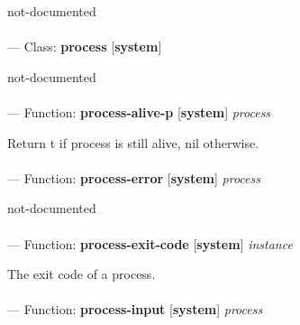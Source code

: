 \begin{adjustwidth}{5em}{5em}
not-documented
\end{adjustwidth}

\paragraph{}
\label{SYSTEM:PROCESS}
--- Class: \textbf{process} [\textbf{system}] \textit{}

\begin{adjustwidth}{5em}{5em}
not-documented
\end{adjustwidth}

\paragraph{}
\label{SYSTEM:PROCESS-ALIVE-P}
--- Function: \textbf{process-alive-p} [\textbf{system}] \textit{process}

\begin{adjustwidth}{5em}{5em}
Return t if process is still alive, nil otherwise.
\end{adjustwidth}

\paragraph{}
\label{SYSTEM:PROCESS-ERROR}
--- Function: \textbf{process-error} [\textbf{system}] \textit{process}

\begin{adjustwidth}{5em}{5em}
not-documented
\end{adjustwidth}

\paragraph{}
\label{SYSTEM:PROCESS-EXIT-CODE}
--- Function: \textbf{process-exit-code} [\textbf{system}] \textit{instance}

\begin{adjustwidth}{5em}{5em}
The exit code of a process.
\end{adjustwidth}

\paragraph{}
\label{SYSTEM:PROCESS-INPUT}
--- Function: \textbf{process-input} [\textbf{system}] \textit{process}

